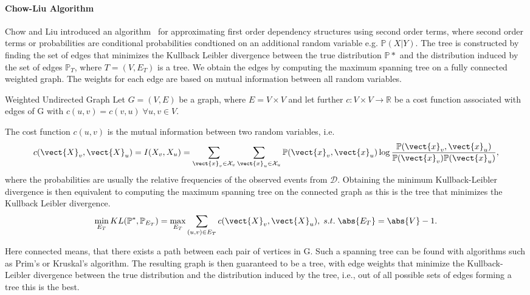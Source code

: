 \paragraph*{Chow-Liu Algorithm}
Chow and Liu introduced an algorithm~\cite{chow1968approximating} for approximating first order dependency structures using second order terms, where second order terms or probabilities are conditional probabilities condtioned on an additional random variable e.g. $\mathbb{P}(X \lvert Y)$.
The tree is constructed by finding the set of edges that minimizes the Kullback Leibler divergence between the true distribution $\mathbb{P}*$ and the distribution induced by the set of edges $\mathbb{P}_T$, where $T=(V, E_T)$ is a tree.
We obtain the edges by computing the maximum spanning tree on a fully connected weighted graph.
The weights for each edge are based on mutual information between all random variables.

\begin{definition}{Weighted Undirected Graph}
    Let $G=(V,E)$ be a graph, where $E = V \times V$ and let further $c: V \times V \rightarrow \mathbb{R}$ be a cost function associated with edges of G with $c(u,v) = c(v,u) \; \forall u,v \in V$.
\end{definition}

The cost function $c(u,v)$ is the mutual information between two random variables, i.e. 
\begin{equation}
    c(\vect{X}_v, \vect{X}_u) = I(X_v, X_u) = \sum_{\vect{x}_v \in \mathcal{X}_v} \sum_{\vect{x}_u \in \mathcal{X}_u} \mathbb{P}(\vect{x}_v,\vect{x}_u) \log \frac{\mathbb{P}(\vect{x}_v,\vect{x}_u) }{\mathbb{P}(\vect{x}_v)  \mathbb{P}(\vect{x}_u)},
\end{equation}
where the probabilities are usually the relative frequencies of the observed events from $\mathcal{D}$.
Obtaining the minimum Kullback-Leibler divergence is then equivalent to computing the maximum spanning tree on the connected graph as this is the tree that minimizes the Kullback Leibler divergence.
\begin{equation}
    \min_{E_T} KL(\mathbb{P}^*, \mathbb{P}_{E_T}) = \max_{E_T} \sum_{(u,v) \in E_T} c(\vect{X}_v, \vect{X}_u), \; s.t. \; \abs{E_T} = \abs{V}-1 .
\end{equation}



Here connected means, that there exists a path between each pair of vertices in G. 
Such a spanning tree can be found with algorithms such as Prim's or Kruskal's algorithm.
The resulting graph is then guaranteed to be a tree, with edge weights that minimize the Kullback-Leibler divergence between the true distribution and the distribution induced by the tree, i.e., out of all possible sets of edges forming a tree this is the best.


